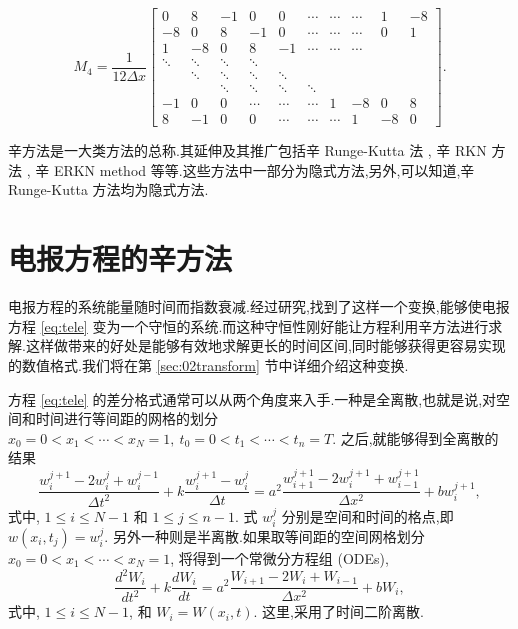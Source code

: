 \begin{equation*}
	M_4=\frac{1}{12\Delta x}\begin{bmatrix}
0 & 8 & -1 & 0 & 0 & \cdots & \cdots & \cdots & 1 & -8\\
-8 & 0 & 8 & -1 & 0 & \cdots & \cdots & \cdots & 0 & 1\\
1 & -8 & 0 & 8 & -1 & \cdots & \cdots & \cdots && \\
\ddots & \ddots & \ddots & \ddots &   &   &   &   && \\
&\ddots & \ddots & \ddots & \ddots &   &   &   &&\\
&&\ddots & \ddots & \ddots & \ddots &   &   && \\
-1 & 0 & 0 & \cdots & \cdots & \cdots & 1 & -8 & 0&8 \\
8&-1 & 0 & 0 & \cdots  & \cdots & \cdots & 1 & -8 & 0
\end{bmatrix}.
\end{equation*}

辛方法是一大类方法的总称.其延伸及其推广包括辛 Runge-Kutta 法 \cite{feng2010symplectic,burrage2014structure}, 辛 RKN 方法 \cite{monovasilis2013exponentially}, 辛 ERKN method \cite{yang2009extended} 等等.这些方法中一部分为隐式方法,另外,可以知道,辛 Runge-Kutta 方法均为隐式方法.

\section{电报方程的辛方法}\label{sec:02telegraph}

电报方程的系统能量随时间而指数衰减.经过研究,找到了这样一个变换,能够使电报方程 \eqref{eq:tele} 变为一个守恒的系统.而这种守恒性刚好能让方程利用辛方法进行求解.这样做带来的好处是能够有效地求解更长的时间区间,同时能够获得更容易实现的数值格式.我们将在第 \ref{sec:02transform} 节中详细介绍这种变换.

方程 \eqref{eq:tele} 的差分格式通常可以从两个角度来入手.一种是全离散,也就是说,对空间和时间进行等间距的网格的划分 $x_0=0<x_1<\cdots<x_N=1,~t_0=0<t_1<\cdots<t_n=T$. 之后,就能够得到全离散的结果
\begin{equation}\label{eq:fulld}
\frac{w_{i}^{j+1}-2w_{i}^{j}+w_{i}^{j-1}}{\Delta t^2}+k\frac{w_{i}^{j+1}-w_{i}^{j}}{\Delta t}=a^2
\frac{w_{i+1}^{j+1}-2w_{i}^{j+1}+w_{i-1}^{j+1}}{\Delta x^2} + b w_{i}^{j+1},
\end{equation}
式中, $1 \le i \le N-1$ 和 $1 \le j \le n-1$. 式 $w_{i}^{j}$ 分别是空间和时间的格点,即$w(x_i,t_j)=w_{i}^{j}$.
另外一种则是半离散.如果取等间距的空间网格划分 $x_0=0<x_1<\cdots<x_N=1$, 将得到一个常微分方程组 (ODEs),
\begin{equation*}
\frac{d^2 W_i}{d t^2}+k\frac{d W_i}{d t}=a^2 \frac{W_{i+1}-2W_{i}+W_{i-1}}{\Delta x^2} + b W_i,
\end{equation*}
式中, $1 \le i \le N-1$, 和 $W_i = W(x_i,t)$. 这里,采用了时间二阶离散.

